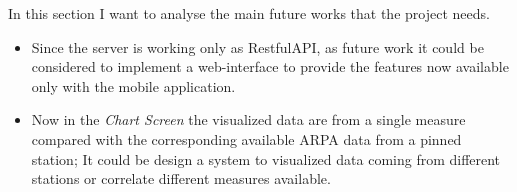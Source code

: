 In this section I want to analyse the main future works that the project needs.

\begin{itemize}
    \item Since the server is working only as RestfulAPI, as future work it could be considered to implement a web-interface to provide the features now available only with the mobile application.
    \item Now in the \textit{Chart Screen} the visualized data are from a single measure compared with the corresponding available ARPA data from a pinned station; It could be design a system to visualized data coming from different stations or correlate different measures available.
\end{itemize}
